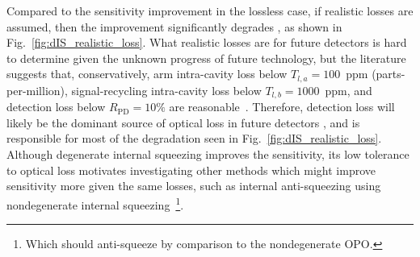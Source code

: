 Compared to the sensitivity improvement in the lossless case, if realistic losses are assumed, then the improvement significantly degrades , as shown in Fig.~\ref{fig:dIS_realistic_loss}. What realistic losses are for future detectors is hard to determine given the unknown progress of future technology, but the literature suggests that, conservatively, arm intra-cavity loss below $T_{l,a}=100$~ppm (parts-per-million), signal-recycling intra-cavity loss below $T_{l,b}=1000$~ppm, and detection loss below $R_\text{PD}=10\%$ are reasonable~\cite{Zhang2021,}. Therefore, detection loss will likely be the dominant source of optical loss in future detectors , and is responsible for most of the degradation seen in Fig.~\ref{fig:dIS_realistic_loss}. 
Although degenerate internal squeezing improves the sensitivity, its low  tolerance to optical loss motivates investigating other methods which might improve sensitivity more given the same losses, such as internal anti-squeezing using nondegenerate internal squeezing~\footnote{Which should anti-squeeze by comparison to the nondegenerate OPO.}.  %





